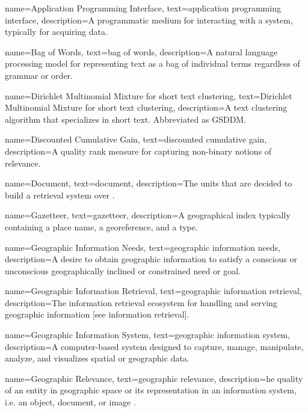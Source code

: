 
{
    name=Application Programming Interface,
    text=application programming interface,
    description={A programmatic medium for interacting with a system, typically for acquiring data.}
}


{
    name=Bag of Words,
    text=bag of words,
    description=A natural language processing model for representing text as a bag of individual terms regardless of grammar or order.
}

{
    name=Dirichlet Multinomial Mixture for short text clustering,
    text=Dirichlet Multinomial Mixture for short text clustering,
    description={A text clustering algorithm that specializes in short text. Abbreviated as GSDDM}.
}

{
    name=Discounted Cumulative Gain,
    text=discounted cumulative gain,
    description=A quality rank measure for capturing non-binary notions of relevance.
}

{
    name=Document,
    text=document,
    description=The units that are decided to build a retrieval system over \cite{Manning2008}.
}

{
    name=Gazetteer,
    text=gazetteer,
    description={A geographical index typically containing a place name, a georeference, and a type.}
}

{
    name=Geographic Information Needs,
    text=geographic information needs,
    description=A desire to obtain geographic information to satisfy a conscious or unconscious geographically inclined or constrained need or goal.
}

{
    name=Geographic Information Retrieval,
    text=geographic information retrieval,
    description=The information retrieval ecosystem for handling and serving geographic information [see information retrieval].
}

{
    name=Geographic Information System,
    text=geographic information system,
    description={A computer-based system designed to capture, manage, manipulate, analyze, and visualizes spatial or geographic data.}
}

{
    name=Geographic Relevance,
    text=geographic relevance,
    description={he quality of an entity in geographic space or its representation in an information system, i.e. an object, document, or image \cite{Reichenbacher2011}.}
}

